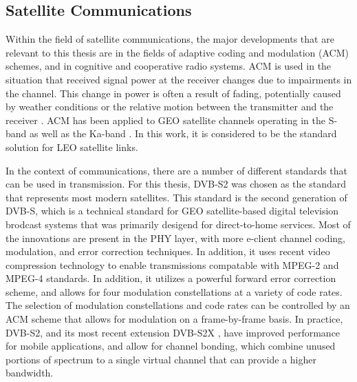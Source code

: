 \subsection{Satellite Communications}
\par Within the field of satellite communications, the major developments that are relevant to this thesis are in the fields of adaptive coding and modulation (ACM) schemes, and in cognitive and cooperative radio systems. ACM is used in the situation that received signal power at the receiver changes due to impairments in the channel. This change in power is often a result of fading, potentially caused by weather conditions or the relative motion between the transmitter and the receiver \cite{paulo17}. ACM has been applied to GEO satellite channels operating in the S-band \cite{paulo18} as well as the Ka-band \cite{paulo19}. In this work, it is considered to be the standard solution for LEO satellite links.  
\par In the context of communications, there are a number of different standards that can be used in transmission. For this thesis, DVB-S2 \cite{paulo21} was chosen as the standard that represents most modern satellites. This standard is the second generation of DVB-S, which is a technical standard for GEO satellite-based digital television brodcast systems that was primarily desigend for direct-to-home services. Most of the innovations are present in the PHY layer, with more e-client channel coding, modulation, and error correction techniques. In addition, it uses recent video compression technology to enable transmissions compatable with MPEG-2 and MPEG-4 standards. In addition, it utilizes a powerful forward error correction scheme, and allows for four modulation constellations at a variety of code rates. The selection of modulation constellations and code rates can be controlled by an ACM scheme that allows for modulation on a frame-by-frame basis. In practice, DVB-S2, and its most recent extension DVB-S2X \cite{paulo22}, have improved performance for mobile applications, and allow for channel bonding, which combine unused portions of spectrum to a single virtual channel that can provide a higher bandwidth.
